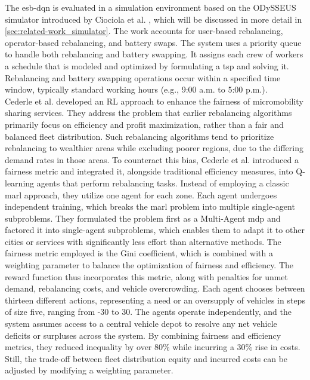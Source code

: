 The \gls{esb-dqn} is evaluated in a simulation environment based on the ODySSEUS simulator introduced by Ciociola et al. \cite{ciociola_e-scooter_2020}, which will be discussed in more detail in \autoref{sec:related-work_simulator}. 
The work accounts for user-based rebalancing, operator-based rebalancing, and battery swaps. 
The system uses a priority queue to handle both rebalancing and battery swapping.
It assigns each crew of workers a schedule that is modeled and optimized by formulating a \gls{tsp} and solving it.
Rebalancing and battery swapping operations occur within a specified time window, typically standard working hours (e.g., 9:00 a.m. to 5:00 p.m.).
\\

Cederle et al. \cite{cederle_fairness-oriented_2025} developed an RL approach to enhance the fairness of micromobility sharing services. 
They address the problem that earlier rebalancing algorithms primarily focus on efficiency and profit maximization, rather than a fair and balanced fleet distribution.
Such rebalancing algorithms tend to prioritize rebalancing to wealthier areas while excluding poorer regions, due to the differing demand rates in those areas.
To counteract this bias, Cederle et al. introduced a fairness metric and integrated it, alongside traditional efficiency measures, into Q-learning agents that perform rebalancing tasks. 
Instead of employing a classic \gls{marl} approach, they utilize one agent for each zone. 
Each agent undergoes independent training, which breaks the \gls{marl} problem into multiple single-agent subproblems. 
They formulated the problem first as a Multi-Agent \gls{mdp} and factored it into single-agent subproblems, which enables them to adapt it to other cities or services with significantly less effort than alternative methods. 
The fairness metric employed is the Gini coefficient, which is combined with a weighting parameter to balance the optimization of fairness and efficiency. 
The reward function thus incorporates this metric, along with penalties for unmet demand, rebalancing costs, and vehicle overcrowding.
Each agent chooses between thirteen different actions, representing a need or an oversupply of vehicles in steps of size five, ranging from -30 to 30. 
The agents operate independently, and the system assumes access to a central vehicle depot to resolve any net vehicle deficits or surpluses across the system.
By combining fairness and efficiency metrics, they reduced inequality by over 80\% while incurring a 30\% rise in costs.
Still, the trade-off between fleet distribution equity and incurred costs can be adjusted by modifying a weighting parameter.

